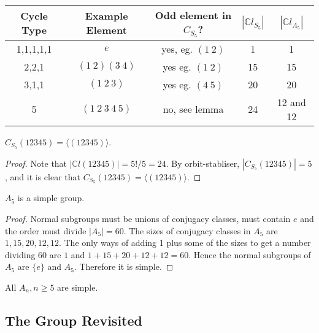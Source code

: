 \documentclass[a4paper]{article}
\begin{document}
      \begin{example}
        \begin{center}
            \begin{tabular}{c|c|c|c|c}
                Cycle Type & Example Element & Odd element in $C_{S_5}$? & $|\mathbb{C}l_{S_5}|$ & $|\mathbb{C}l_{A_5}|$ \\
                \hline 
                1,1,1,1,1 & $e$ & yes, eg. $(1\ 2)$ & 1 & 1\\
                2,2,1 & $(1\ 2)(3\ 4)$ & yes eg. $(1\ 2)$ & 15 & 15\\
                3,1,1 & $(1\ 2\ 3)$ & yes eg. $(4\ 5)$ & 20 & 20\\
                5 & $(1\ 2\ 3\ 4\ 5)$ & no, see lemma & 24 & 12 and 12\\
            \end{tabular}
        \end{center}
        \begin{lemma}\label{lma:5.31}
            $ C_{S_5}(12345)=\langle (12345) \rangle $.
        \end{lemma}
        \begin{proof}
            Note that $ |\mathbb{C}l(12345)|=5!/5=24 $. By orbit-stabliser, $ |C_{S_5}(12345)|=5 $, and it is clear that $C_{S_5}(12345)=\langle (12345) \rangle$.
        \end{proof}
      \end{example}
      \begin{theorem}\label{thm:5.32}
          $A_5$ is a simple group.
      \end{theorem}
      \begin{proof}
          Normal subgroups must be unions of conjugacy classes, must contain $e$ and the order must divide $|A_5|=60$. The sizes of conjugacy classes in $A_5$ are $1,15,20,12,12$. The only ways of adding 1 plus some of the sizes to get a number dividing 60 are $ 1 $ and $ 1+15+20+12+12=60 $. Hence the normal subgroups of $A_5$ are $\{e\}$ and $A_5$. Therefore it is simple. 
      \end{proof}
      \begin{remark}
          All $A_n, n\ge 5$ are simple.
      \end{remark}
      
      \subsection{The \mobius Group Revisited}
\end{document}
